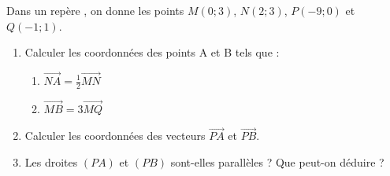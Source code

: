 
Dans un repère \Oij, on donne les points $M(0;3)$, $N(2;3)$, $P(-9;0)$ et $Q(-1;1)$.
\begin{enumerate}
\item Calculer les coordonnées des points A et B tels que :
 \begin{enumerate}
\item $\overrightarrow{NA}=\frac{1}{2}\overrightarrow{MN}$
\item $\overrightarrow{MB}=3\overrightarrow{MQ}$
\end{enumerate}
\item Calculer les coordonnées des vecteurs $\overrightarrow{PA}$ et $\overrightarrow{PB}$.
\item Les droites $(PA)$ et $(PB)$ sont-elles parallèles ? Que peut-on déduire ?
\end{enumerate}
